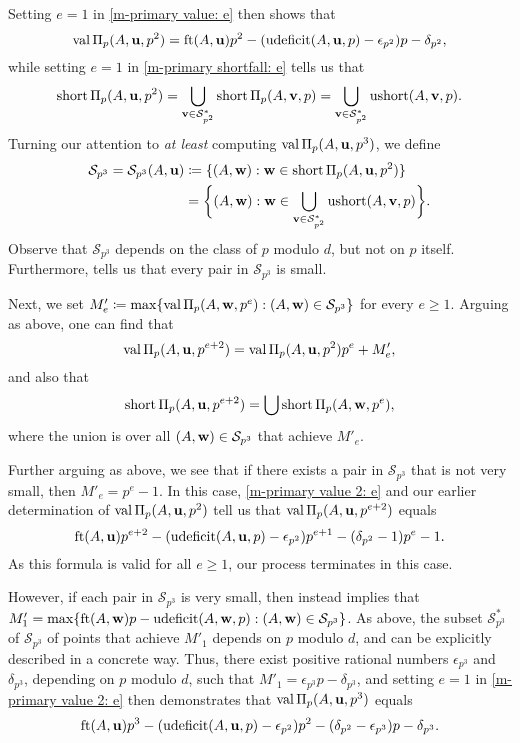 \documentclass[11pt]{amsart}
\newcommand{\short}{\operatorname{short}}
\newcommand{\ushort}{\operatorname{ushort}}
\newcommand{\udeficit}{\operatorname{udeficit}}
\newcommand{\denom}{d}
\renewcommand{\S}{\mathcal{S}}
\begin{document}
Setting $e=1$ in \eqref{m-primary value: e} then shows that 
%
\[ \val \IP_p(A,\vv{u},p^2) = \ft{A}{\vv{u}}p^2 - (\udeficit(A,\vv{u},p)-\epsilon_{p^2})p - \delta_{p^2},  \] 
%
while setting $e=1$ in \eqref{m-primary shortfall: e} tells us that
%
\[ \short \IP_p(A,\vv{u},p^2) = \bigcup_{\vv{v} \in \S_{p^2}^{\ast}} \short \IP_p(A,\vv{v},p) = \bigcup_{\vv{v} \in \S_{p^2}^{\ast}} \ushort(A,\vv{v},p). \]  
%
Turning our attention to \emph{at least} computing $\operatorname{val} \Pi_p(A,\mathbf{u},p^3)$, we define
\begin{align*}
\S_{p^3} = \S_{p^3}(A,\vv{u}) & \coloneqq \{ (A,\vv{w}):  \vv{w} \in \short \IP_p(A,\vv{u},p^2) \} \\
 & = \bigg\{ (A,\vv{w}): \vv{w} \in \bigcup_{\vv{v} \in \S_{p^2}^{\ast}} \ushort(A,\vv{v},p) \bigg\}. 
\end{align*}
Observe that $\S_{p^3}$ depends on the class of $p$ modulo $\denom$, but not on $p$ itself.
Furthermore,  tells us that every pair in $\S_{p^3}$ is small.

Next, we set $M'_e  \coloneqq \max \{ \val \IP_p(A, \vv{w}, p^e) :  (A,\vv{w}) \in \S_{p^3}\}$ for every $e \geq 1$.
Arguing as above, one can find that
\begin{equation}
\label{m-primary value 2: e}
 \operatorname{val} \Pi_p(A,\mathbf{u},p^{e+2}) = \operatorname{val} \Pi_p(A,\mathbf{u},p^2)p^e+ M'_e,
\end{equation}
and also that 
%
\begin{equation}
\label{m-primary shortfall 2: e}
\short \IP_p(A,\vv{u},p^{e+2}) = \bigcup \short \IP_p(A,\vv{w}, p^e),
\end{equation}
where the union is over all $(A,\vv{w}) \in \S_{p^3}$ that achieve $M'_e$.

Further arguing as above, we see that if there exists a pair in $\S_{p^3}$ that is not very small, then $M'_e = p^e-1$.
In this case, \eqref{m-primary value 2: e} and our earlier determination of $\operatorname{val} \Pi_p(A,\mathbf{u},p^2)$ tell us that $\operatorname{val} \Pi_p(A,\mathbf{u},p^{e+2})$ equals
%
\[ \ft{A}{\vv{u}}p^{e+2} - (\udeficit(A,\vv{u},p)-\epsilon_{p^2})p^{e+1} - (\delta_{p^2}-1)p^e -1. \] 
%
As this formula is valid for all $e \geq 1$, our process terminates in this case.

However, if each pair in $\S_{p^3}$ is very small, then  instead implies that $M'_1 = \max \{ \ft{A}{\vv{w}}p-\udeficit(A,\vv{w},p) : (A,\vv{w}) \in \S_{p^3}\}$.
As above, the subset $\S^{\ast}_{p^3}$ of $\S_{p^3}$ of points that achieve $M'_1$ depends on $p$ modulo $\denom$, and can be explicitly described in a concrete way.
Thus, there exist positive rational numbers $\epsilon_{p^3}$ and $\delta_{p^3}$, depending on $p$ modulo $\denom$, such that $M'_1 = \epsilon_{p^3} p -\delta_{p^3}$, and setting $e=1$ in \eqref{m-primary value 2: e} then demonstrates that $\operatorname{val} \Pi_p(A,\mathbf{u},p^3)$ equals
%
\[ \ft{A}{\vv{u}}p^{3} - (\udeficit(A,\vv{u},p)-\epsilon_{p^2})p^{2} - (\delta_{p^2}- \epsilon_{p^3})p -\delta_{p^3}. \] 
%
\end{document}
